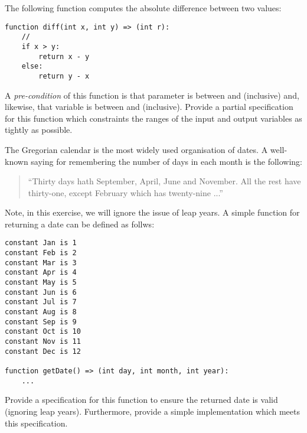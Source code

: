 \begin{ex}
  The following function computes the absolute difference between two values:

\begin{lstlisting}
function diff(int x, int y) => (int r):
    //
    if x > y:
        return x - y
    else:
        return y - x
\end{lstlisting}

A {\em pre-condition} of this function is that parameter 
is between  and  (inclusive) and,
likewise, that variable  is between  and
 (inclusive).  Provide a partial specification for
this function which constraints the ranges of the input and output
variables as tightly as possible.
\end{ex}

\begin{ex}
The Gregorian calendar is the most widely used organisation of dates.
A well-known saying for remembering the number of days in each month
is the following:
\begin{quote}
``Thirty days hath September, April, June and November.  All the rest
have thirty-one, except February which has twenty-nine ...''
\end{quote}
Note, in this exercise, we will ignore the issue of leap years.  A
simple function for returning a date can be defined as follws:
\begin{lstlisting}
constant Jan is 1
constant Feb is 2
constant Mar is 3
constant Apr is 4
constant May is 5
constant Jun is 6
constant Jul is 7
constant Aug is 8
constant Sep is 9
constant Oct is 10
constant Nov is 11
constant Dec is 12

function getDate() => (int day, int month, int year):
    ...
\end{lstlisting}
Provide a specification for this function to ensure the returned date
is valid (ignoring leap years).  Furthermore, provide a simple
implementation which meets this specification.
\end{ex}

